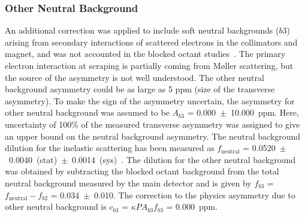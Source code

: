 \subsubsection{Other Neutral Background}
\label{Other Neutral Background}
An additional correction was applied to include soft neutral backgrounds ($b3$) arising from secondary interactions of scattered electrons in the collimators and magnet, and was not accounted in the blocked octant studies~\cite{elog:mack_analysis714}. 
The primary electron interaction at scraping is partially coming from M{\o}ller scattering, but the source of the asymmetry is not well understood. 
The other neutral background asymmetry could be as large as 5 ppm (size of the transverse asymmetry).
To make the sign of the asymmetry uncertain, the asymmetry for other neutral background was assumed to be $A_{b3}$ = 0.000~$\pm$~10.000~ppm. Here, uncertainty of 100\% of the measured transverse asymmetry was assigned to give an upper bound on the neutral background asymmetry. 
The neutral background dilution for the inelastic scattering has been measured as $f_\textrm{neutral}$ = 0.0520~$\pm$~0.0040~(stat)~$\pm$~0.0014~(sys)~\cite{rakitha_neutral_background}. The dilution for the other neutral background was obtained by subtracting the blocked octant background from the total neutral background measured by the main detector and is given by $f_{b3}$ = $f_\textrm{neutral} - f_{b2}$ = 0.034~$\pm$~0.010. The correction to the physics asymmetry due to other neutral background is $c_{b3}$ = $\kappa PA_{b3}f_{b3}$ = 0.000~ppm.


